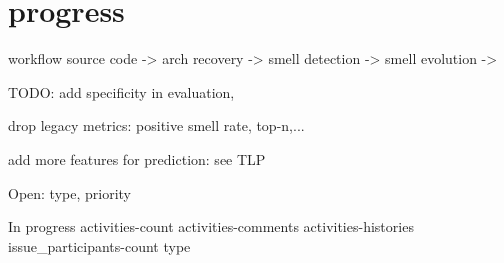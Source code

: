 \section{progress}

workflow 
source code -> arch recovery -> smell detection -> smell evolution -> 

TODO: 
add specificity in evaluation, 

drop legacy metrics: positive smell rate, top-n,...

add more features for prediction: see TLP 

Open: type, priority

In progress 
activities-count
activities-comments
activities-histories
issue_participants-count
type